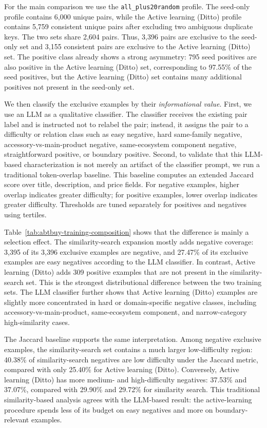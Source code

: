 For the main comparison we use the \texttt{all\_plus20random} profile. The seed-only profile contains 6{,}000 unique pairs, while the Active learning (Ditto) profile contains 5{,}759 consistent unique pairs after excluding two ambiguous duplicate keys. The two sets share 2{,}604 pairs. Thus, 3{,}396 pairs are exclusive to the seed-only set and 3{,}155 consistent pairs are exclusive to the Active learning (Ditto) set. The positive class already shows a strong asymmetry: 795 seed positives are also positive in the Active learning (Ditto) set, corresponding to 97.55\% of the seed positives, but the Active learning (Ditto) set contains many additional positives not present in the seed-only set.

We then classify the exclusive examples by their \emph{informational value}. First, we use an LLM as a qualitative classifier. The classifier receives the existing pair label and is instructed not to relabel the pair; instead, it assigns the pair to a difficulty or relation class such as easy negative, hard same-family negative, accessory-vs-main-product negative, same-ecosystem component negative, straightforward positive, or boundary positive. Second, to validate that this LLM-based characterization is not merely an artifact of the classifier prompt, we run a traditional token-overlap baseline. This baseline computes an extended Jaccard score over title, description, and price fields. For negative examples, higher overlap indicates greater difficulty; for positive examples, lower overlap indicates greater difficulty. Thresholds are tuned separately for positives and negatives using tertiles.


Table~\ref{tab:abtbuy-training-composition} shows that the difference is mainly a selection effect. The similarity-search expansion mostly adds negative coverage: 3{,}395 of its 3{,}396 exclusive examples are negative, and 27.47\% of its exclusive examples are easy negatives according to the LLM classifier. In contrast, Active learning (Ditto) adds 309 positive examples that are not present in the similarity-search set. This is the strongest distributional difference between the two training sets. The LLM classifier further shows that Active learning (Ditto) examples are slightly more concentrated in hard or domain-specific negative classes, including accessory-vs-main-product, same-ecosystem component, and narrow-category high-similarity cases.

The Jaccard baseline supports the same interpretation. Among negative exclusive examples, the similarity-search set contains a much larger low-difficulty region: 40.38\% of similarity-search negatives are low difficulty under the Jaccard metric, compared with only 25.40\% for Active learning (Ditto). Conversely, Active learning (Ditto) has more medium- and high-difficulty negatives: 37.53\% and 37.07\%, compared with 29.90\% and 29.72\% for similarity search. This traditional similarity-based analysis agrees with the LLM-based result: the active-learning procedure spends less of its budget on easy negatives and more on boundary-relevant examples.

